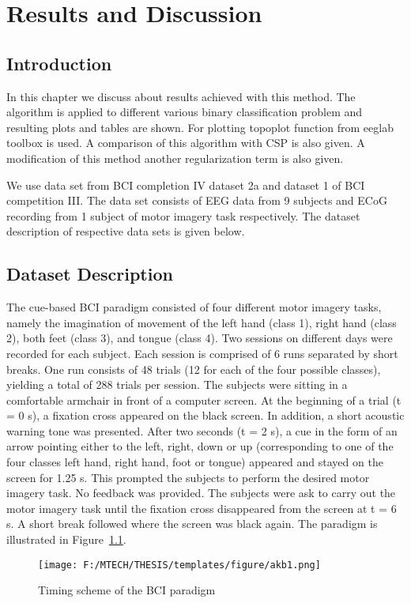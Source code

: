 \chapter{Results and Discussion}
\section{Introduction}
In this chapter we discuss about results achieved with this method. The algorithm is applied to different various binary classification problem and resulting plots and tables are shown. For plotting topoplot function from eeglab toolbox is used. A comparison of this algorithm with CSP is also given. A modification of this method another regularization term is also given.

   We use data set from BCI completion IV dataset 2a and dataset 1 of BCI competition III. The data set consists of EEG data from 9 subjects and ECoG recording from 1 subject of motor imagery task respectively.  The dataset description of respective data sets is given below.
  
\section{Dataset Description }
The cue-based BCI paradigm consisted of four different motor imagery tasks, namely the imagination of movement of the left hand (class 1), right hand (class 2), both feet (class 3), and tongue (class 4). Two sessions on different days were recorded for each subject. Each session is comprised of 6 runs separated by short breaks. One run consists of 48 trials (12 for each of the four possible classes), yielding a total of 288 trials per session.
   The subjects were sitting in a comfortable armchair in front of a computer screen. At the beginning of a trial (t = 0 s), a fixation cross appeared on the black screen. In addition, a short acoustic warning tone was presented. After two seconds (t = 2 s), a cue in the form of an arrow pointing either to the left, right, down or up (corresponding to one of the four classes left hand, right hand, foot or tongue) appeared and stayed on the screen for 1.25 s. This prompted the subjects to perform the desired motor imagery task. No feedback was provided. The subjects were ask to carry out the motor imagery task until the fixation cross disappeared from the screen at t = 6 s. A short break followed where the screen was black again. The paradigm is illustrated in Figure~\ref{akb1}.
   \begin{figure}[hbtp]
\centering
\texttt{[image: F:/MTECH/THESIS/templates/figure/akb1.png]}
\caption{Timing scheme of the BCI paradigm}
\label{akb1}
\end{figure}
